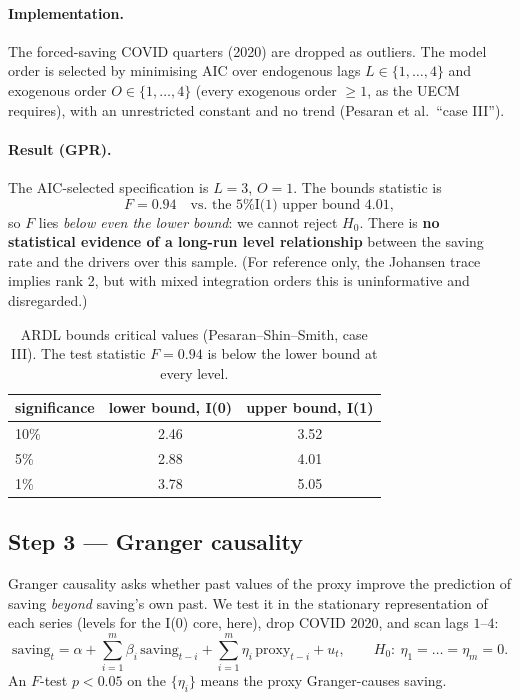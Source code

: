 \documentclass[11pt,a4paper]{article}
\begin{document}
\paragraph{Implementation.} The forced-saving COVID quarters (2020) are dropped
as outliers. The model order is selected by minimising AIC over endogenous lags
$L\in\{1,\dots,4\}$ and exogenous order $O\in\{1,\dots,4\}$ (every exogenous
order $\ge 1$, as the UECM requires), with an unrestricted constant and no trend
(Pesaran et al.\ ``case III'').

\paragraph{Result (GPR).} The AIC-selected specification is $L=3$, $O=1$. The
bounds statistic is
\[
  F = 0.94 \quad\text{vs.\ the 5\% I(1) upper bound } 4.01,
\]
so $F$ lies \emph{below even the lower bound}: we cannot reject $H_0$. There is
\textbf{no statistical evidence of a long-run level relationship} between the
saving rate and the drivers over this sample. (For reference only, the Johansen
trace implies rank 2, but with mixed integration orders this is uninformative and
disregarded.)

\begin{table}[htbp]\centering
\caption{ARDL bounds critical values (Pesaran--Shin--Smith, case III). The
test statistic $F=0.94$ is below the lower bound at every level.}
\renewcommand{\arraystretch}{1.15}
\begin{tabular}{@{}lcc@{}}
\toprule
significance & lower bound, I(0) & upper bound, I(1) \\
\midrule
10\% & 2.46 & 3.52 \\
 5\% & 2.88 & 4.01 \\
 1\% & 3.78 & 5.05 \\
\bottomrule
\end{tabular}
\end{table}

\subsection{Step 3 --- Granger causality}
Granger causality asks whether past values of the proxy improve the prediction of
saving \emph{beyond} saving's own past. We test it in the stationary
representation of each series (levels for the I(0) core, here), drop COVID 2020,
and scan lags $1$--$4$:
\begin{equation}
  \text{saving}_t = \alpha + \sum_{i=1}^{m}\beta_i\,\text{saving}_{t-i}
    + \sum_{i=1}^{m}\eta_i\,\text{proxy}_{t-i} + u_t,
  \qquad H_0:\ \eta_1=\dots=\eta_m=0 .
\end{equation}
An $F$-test $p<0.05$ on the $\{\eta_i\}$ means the proxy Granger-causes saving.
\end{document}
